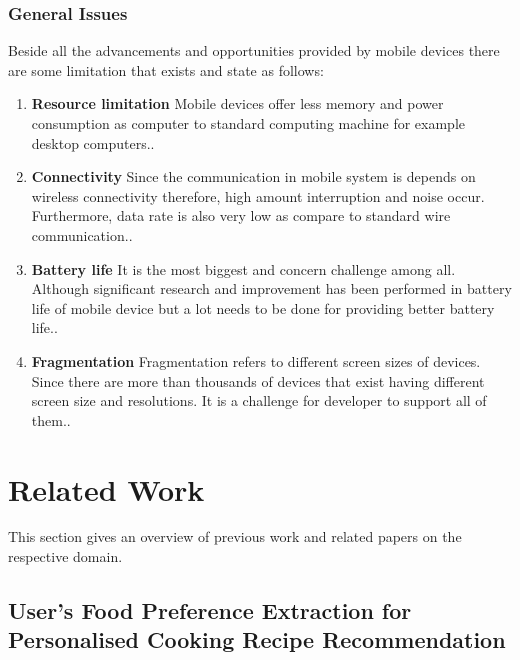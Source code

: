 \subsubsection{General Issues}

Beside all the advancements and opportunities provided by mobile devices there are some limitation that exists and state as follows:

\begin{enumerate}
	
	\item \textbf{Resource limitation}\newline 
	Mobile devices offer less memory and power consumption as computer to standard computing machine for example desktop computers.\cite{ricci2010mobile}. 
	
	\item \textbf{Connectivity}\newline 
	Since the communication in mobile system is depends on wireless connectivity therefore, high amount interruption and noise occur. Furthermore,  data rate is also very low as compare to standard wire communication.\cite{ricci2010mobile}.
	
	\item \textbf{Battery life}\newline
	It is the most biggest and concern challenge among all. Although significant research and improvement has been performed in battery life of mobile device but a lot needs to be done for providing better battery life.\cite{ricci2010mobile}.
	
	\item \textbf{Fragmentation}\newline 
		Fragmentation refers to different screen sizes of devices. Since there are more than thousands of devices that exist having different screen size and resolutions. It is a challenge for developer to support all of them.\cite{ricci2010mobile}.
\end{enumerate}

\section{Related Work}
This section gives an overview of previous work and related papers on the respective domain.

\subsection{User's Food Preference Extraction for Personalised Cooking Recipe Recommendation}

